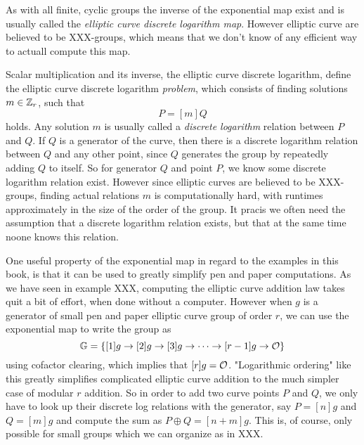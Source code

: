As with all finite, cyclic groups the inverse of the exponential map exist and is usually called the \textit{elliptic curve discrete logarithm map}. However elliptic curve are believed to be XXX-groups, which means that we don't know of any efficient way to actuall compute this map.

Scalar multiplication and its inverse, the elliptic curve discrete logarithm, define the elliptic curve discrete logarithm \textit{problem}, which consists of finding solutions $m\in\mathbb{Z}_r$, such that
\begin{equation}
P = [m]Q
\end{equation}
holds. Any solution $m$ is usually called a \textit{discrete logarithm} relation between $P$ and $Q$. If $Q$ is a generator of the curve, then there is a discrete logarithm relation between $Q$ and any other point, since $Q$ generates the group by repeatedly adding $Q$ to itself. So for generator $Q$ and point $P$, we know some discrete logarithm relation exist. However since elliptic curves are believed to be XXX-groups, finding actual relations $m$ is computationally hard, with runtimes approximately in the size of the order of the group. It pracis we often need the assumption that a discrete logarithm relation exists, but that at the same time noone knows this relation.

One useful property of the exponential map in regard to the examples in this book, is that it can be used to greatly simplify pen and paper computations. As we have seen in example XXX, computing the elliptic curve addition law takes quit a bit of effort, when done without a computer. However when $g$ is a generator of small pen and paper elliptic curve group of order $r$, we can use the exponential map to write the group as
\begin{equation}
\mathbb{G} = \{[1]g\to [2]g \to [3]g\to\cdots\to [r-1]g\to \mathcal{O}\}
\end{equation}
using cofactor clearing, which implies that $[r]g=\mathcal{O}$. "Logarithmic ordering" like this greatly simplifies complicated elliptic curve addition to the much simpler case of modular $r$ addition. So in order to add two curve points $P$ and $Q$, we only have to look up their discrete log relations with the generator, say $P=[n]g$ and $Q=[m]g$ and compute the sum as $P\oplus Q = [n+m]g$. This is, of course, only possible for small groups which we can organize as in XXX.

